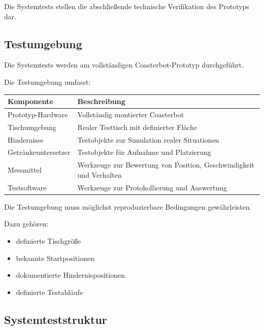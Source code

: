 Die Systemtests stellen die abschließende technische Verifikation des
Prototyps dar.

\subsection{Testumgebung}\label{testumgebung-1}

Die Systemtests werden am vollständigen Coasterbot-Prototyp
durchgeführt.

Die Testumgebung umfasst:

\begin{longtable}[]{@{}
  >{\raggedright\arraybackslash}p{}
  >{\raggedright\arraybackslash}p{}@{}}
\toprule\noalign{}
\begin{minipage}[b]{\linewidth}\raggedright
Komponente
\end{minipage} & \begin{minipage}[b]{\linewidth}\raggedright
Beschreibung
\end{minipage} \\
\midrule\noalign{}
\endhead
\bottomrule\noalign{}
\endlastfoot
Prototyp-Hardware & Vollständig montierter Coasterbot \\
Tischumgebung & Realer Testtisch mit definierter Fläche \\
Hindernisse & Testobjekte zur Simulation realer Situationen \\
Getränkeuntersetzer & Testobjekte für Aufnahme und Platzierung \\
Messmittel & Werkzeuge zur Bewertung von Position, Geschwindigkeit und
Verhalten \\
Testsoftware & Werkzeuge zur Protokollierung und Auswertung \\
\end{longtable}

Die Testumgebung muss möglichst reproduzierbare Bedingungen
gewährleisten.

Dazu gehören:

\begin{itemize}
\tightlist
\item
  definierte Tischgröße
\item
  bekannte Startpositionen
\item
  dokumentierte Hindernispositionen
\item
  definierte Testabläufe
\end{itemize}

\subsection{Systemteststruktur}\label{systemteststruktur}

